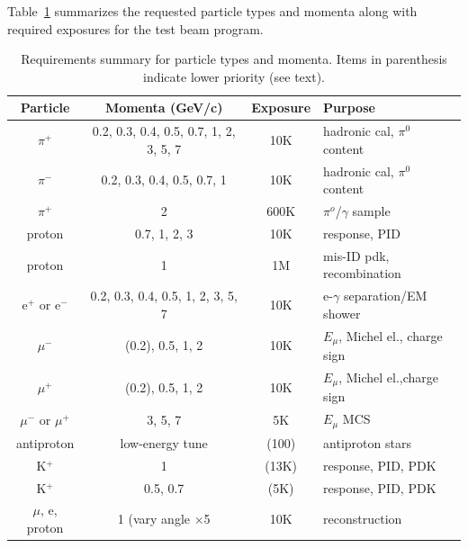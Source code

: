 Table~\ref{tab:runsum} summarizes the requested particle types and momenta along with 
required exposures for the test beam program.
\begin{table}[h]
\centering
\begin{tabular}{|c|c|c|l|}
\hline
Particle & Momenta (GeV/c) & Exposure & Purpose \\ \hline
$\pi^+$       & 0.2, 0.3, 0.4, 0.5, 0.7, 1, 2, 3, 5, 7     &  10K  & hadronic cal, $\pi^0$ content \\ \hline
$\pi^-$       &  0.2, 0.3, 0.4, 0.5, 0.7, 1     &  10K  & hadronic cal, $\pi^0$ content \\ \hline
$\pi^+$   &  2  &  600K & $\pi^o$/$\gamma$ sample \\ \hline
proton &  0.7, 1, 2, 3   &  10K & response, PID \\ \hline
proton &  1   &  1M & mis-ID pdk, recombination \\ \hline
e$^+$ or e$^-$       &    0.2, 0.3, 0.4, 0.5, 1, 2, 3, 5, 7        &    10K   & e-$\gamma$ separation/EM shower     \\ \hline
$\mu^-$  &   (0.2), 0.5, 1, 2  &  10K & $E_\mu$, Michel el., charge sign \\ \hline
$\mu^+$ &   (0.2), 0.5, 1, 2   &  10K & $E_\mu$, Michel el.,charge sign  \\ \hline
$\mu^-$ or $\mu^+$ &   3, 5, 7  &  5K & $E_\mu$ MCS \\ \hline
antiproton &  low-energy tune  &  (100) & antiproton stars \\ \hline
K$^+$  & 1 & (13K)   &   response, PID, PDK  \\ \hline
K$^+$  & 0.5, 0.7 & (5K)   &   response, PID, PDK  \\ \hline \hline
$\mu$, e, proton  & 1 (vary angle $\times$5 & 10K  & reconstruction  \\ \hline
\end{tabular}
\caption{Requirements summary for particle types and momenta. Items in parenthesis indicate lower priority (see text).
}
\label{tab:runsum}
\end{table}



